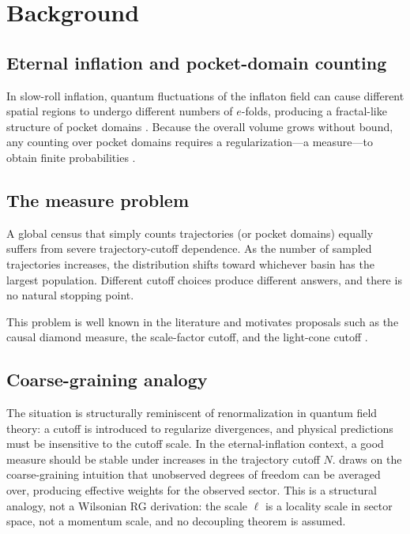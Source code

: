 \section{Background}
\label{sec:background}

\subsection{Eternal inflation and pocket-domain counting}

In slow-roll inflation, quantum fluctuations of the inflaton field can cause
different spatial regions to undergo different numbers of $e$-folds, producing
a fractal-like structure of pocket domains \cite{guth_eternal}.
Because the overall volume grows without bound, any counting over pocket
domains requires a regularization---a measure---to obtain finite
probabilities \cite{freivogel_measure}.

\subsection{The measure problem}

A global census that simply counts trajectories (or pocket domains) equally
suffers from severe trajectory-cutoff dependence. As the number of sampled
trajectories increases, the distribution shifts toward whichever basin has the
largest population. Different cutoff choices produce different answers, and
there is no natural stopping point.

This problem is well known in the literature \cite{freivogel_measure} and
motivates proposals such as the causal diamond measure, the scale-factor
cutoff, and the light-cone cutoff \cite{winitzki_measure,garriga_vilenkin,bousso_causal}.

\subsection{Coarse-graining analogy}

The situation is structurally reminiscent of renormalization in quantum field
theory: a cutoff is introduced to regularize divergences, and physical
predictions must be insensitive to the cutoff scale.
In the eternal-inflation context, a good measure should be stable under
increases in the trajectory cutoff $N$.
\ISR draws on the coarse-graining intuition that unobserved degrees
of freedom can be averaged over, producing effective weights for
the observed sector.
This is a structural analogy, not a Wilsonian RG derivation: the
scale $\ell$ is a locality scale in sector space, not a momentum scale,
and no decoupling theorem is assumed.

